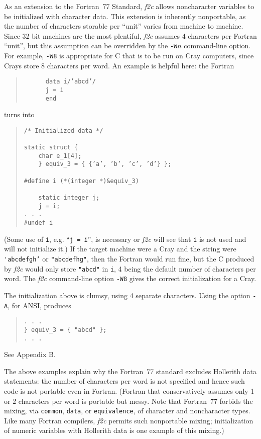 \documentclass[12pt]{article}
\begin{document}
As an extension to the Fortran~77 Standard, \emph{f2c} allows noncharacter variables to be initialized with character data. This extension is inherently nonportable, as the number of characters storable per ``unit'' varies from machine to machine. Since 32 bit machines are the most plentiful, \emph{f2c} assumes 4 characters per Fortran ``unit'', but this assumption can be overridden by the \verb|-W|$n$ command-line option. For example, \verb|-W8| is appropriate for C that is to be run on Cray computers, since Crays store 8 characters per word. An example is helpful here: the Fortran
\begin{quote}
\begin{verbatim}
      data i/’abcd’/
      j = i
      end
\end{verbatim}
\end{quote}
turns into
\begin{quote}
\begin{verbatim}
/* Initialized data */

static struct {
    char e_1[4];
    } equiv_3 = { {’a’, ’b’, ’c’, ’d’} };

#define i (*(integer *)&equiv_3)

    static integer j;
    j = i;
. . .
#undef i
\end{verbatim}
\end{quote}
(Some use of \verb|i|, e.g. ``\verb|j = i|'', is necessary or \emph{f2c} will see that \verb|i| is not used and will not initialize it.) If the target machine were a Cray and the string were \verb|'abcdefgh’| or \verb|"abcdefhg"|, then the Fortran would run fine, but the C produced by \emph{f2c} would only store \verb|"abcd"| in \verb|i|, 4 being the default number of characters per word. The \emph{f2c} command-line option \verb|-W8| gives the correct initialization for a Cray.

The initialization above is clumsy, using 4 separate characters. Using the option \verb|-A|, for ANSI, produces
\begin{quote}
\begin{verbatim}
. . .
} equiv_3 = { "abcd" };
. . .
\end{verbatim}
\end{quote}
See Appendix B.

The above examples explain why the Fortran~77 standard excludes Hollerith data statements: the number of characters per word is not specified and hence such code is not portable even in Fortran. (Fortran that conservatively assumes only 1 or 2 characters per word is portable but messy. Note that Fortran~77 forbids the mixing, via \verb|common|, \verb|data|, or \verb|equivalence|, of character and noncharacter types. Like many Fortran compilers, \emph{f2c} permits such nonportable mixing; initialization of numeric variables with Hollerith data is one example of this mixing.)
\end{document}
